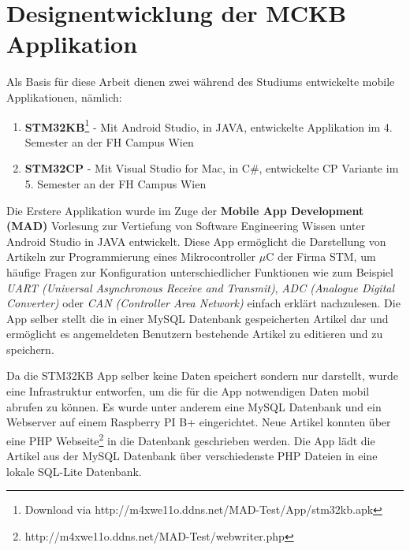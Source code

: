 %
%
% 
% 


\chapter{Designentwicklung der MCKB Applikation}
\label{chap:xamarinformsdevelopment}

	Als Basis für diese Arbeit dienen zwei während des Studiums entwickelte mobile Applikationen, nämlich:

	\begin{enumerate}
		\setlength\itemsep{0em}
		\item \textbf{STM32KB}\footnote{Download via http://m4xwe11o.ddns.net/MAD-Test/App/stm32kb.apk} - Mit Android Studio, in JAVA, entwickelte Applikation im 4. Semester an der FH Campus Wien
		\item \textbf{STM32CP} - Mit Visual Studio for Mac, in C\#, entwickelte CP Variante im 5. Semester an der FH Campus Wien
	\end{enumerate}

	Die Erstere Applikation wurde im Zuge der \textbf{Mobile App Development (MAD)} Vorlesung zur Vertiefung von Software Engineering Wissen unter Android Studio in JAVA entwickelt. Diese App ermöglicht die Darstellung von Artikeln zur Programmierung eines Mikrocontroller $\mu$C der Firma STM, um häufige Fragen zur Konfiguration unterschiedlicher Funktionen wie zum Beispiel \textit{UART (Universal Asynchronous Receive and Transmit)}, \textit{ADC (Analogue Digital Converter)} oder \textit{CAN (Controller Area Network)} einfach erklärt nachzulesen. Die App selber stellt die in einer MySQL Datenbank gespeicherten Artikel dar und ermöglicht es angemeldeten Benutzern bestehende Artikel zu editieren und zu speichern.

	Da die STM32KB App selber keine Daten speichert sondern nur darstellt, wurde eine Infrastruktur entworfen, um die für die App notwendigen Daten mobil abrufen zu können. Es wurde unter anderem eine MySQL Datenbank und ein Webserver auf einem Raspberry PI B+ eingerichtet. Neue Artikel konnten über eine PHP Webseite\footnote{http://m4xwe11o.ddns.net/MAD-Test/webwriter.php} in die Datenbank geschrieben werden. Die App lädt die Artikel aus der MySQL Datenbank über verschiedenste PHP Dateien in eine lokale SQL-Lite Datenbank.


